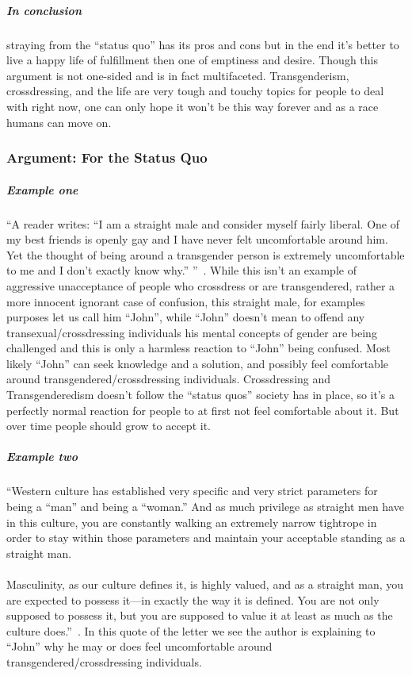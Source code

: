\subparagraph{In conclusion}
straying from the ``status quo'' has its pros and cons but in the end it's
better to live a happy life of fulfillment then one of emptiness and desire.
Though this argument is not one-sided and is in fact multifaceted.
Transgenderism, crossdressing, and the life are very tough and touchy topics for
people to deal with right now, one can only hope it won't be this way forever
and as a race humans can move on.
\par

\subsubsection{Argument: For the Status Quo}

\subparagraph{Example one}
``A reader writes: ``I am a straight male and consider myself fairly liberal.
One of my best friends is openly gay and I have never felt uncomfortable around
him. Yet the thought of being around a transgender person is extremely
uncomfortable to me and I don’t exactly know why.'' ''~\cite[p.~1]{WDTMU}.
While this isn't an example of aggressive unacceptance of people who crossdress
or are transgendered, rather a more innocent ignorant case of confusion, this
straight male, for examples purposes let us call him ``John'', while ``John''
doesn't mean to offend any transexual/crossdressing individuals his mental
concepts of gender are being challenged and this is only a harmless reaction to
``John'' being confused. Most likely ``John'' can seek knowledge and a solution,
and possibly feel comfortable around transgendered/crossdressing individuals.
Crossdressing and Transgenderedism doesn't follow the ``status quos'' society
has in place, so it's a perfectly normal reaction for people to at first not
feel comfortable about it. But over time people should grow to accept it.
\par

\subparagraph{Example two}
``Western culture has established very specific and very strict parameters for
being a ``man'' and being a ``woman.'' And as much privilege as straight men
have in this culture, you are constantly walking an extremely narrow tightrope
in order to stay within those parameters and maintain your acceptable standing
as a straight man. \\~\\ Masculinity, as our culture defines it, is highly
valued, and as a straight man, you are expected to possess it---in exactly the
way it is defined. You are not only supposed to possess it, but you are supposed
to value it at least as much as the culture does.''~\cite[p.~1]{WDTMU}. In this
quote of the letter we see the author is explaining to ``John'' why he may or
does feel uncomfortable around transgendered/crossdressing individuals.
\par

